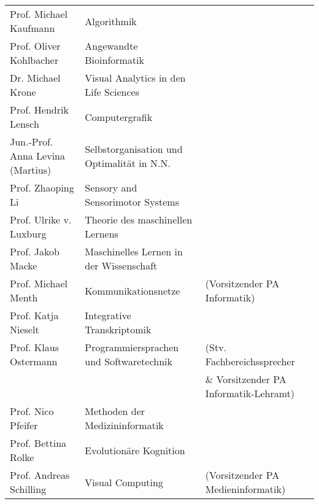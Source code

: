 \begin{tabular}{|lll|}
	Prof. Michael Kaufmann           & Algorithmik                                           &                                          \\
	Prof. Oliver Kohlbacher          & Angewandte Bioinformatik                              &                                          \\
	Dr. Michael Krone                & Visual Analytics in den Life Sciences                 &                                          \\
	Prof. Hendrik Lensch             & Computergrafik                                        &                                          \\
	Jun.-Prof. Anna Levina (Martius) & Selbstorganisation und Optimalität in N.N.            &                                          \\
	Prof. Zhaoping Li                & Sensory and Sensorimotor Systems                      &                                          \\
	Prof. Ulrike v. Luxburg          & Theorie des maschinellen Lernens                      &                                          \\
	Prof. Jakob Macke                & Maschinelles Lernen in der Wissenschaft               &                                          \\
	Prof. Michael Menth              & Kommunikationsnetze                                   & (Vorsitzender PA Informatik)             \\
	Prof. Katja Nieselt              & Integrative Transkriptomik                            &                                          \\
	Prof. Klaus Ostermann            & Programmiersprachen und Softwaretechnik               & (Stv. Fachbereichssprecher               \\
	                                 &                                                       & \& Vorsitzender PA Informatik-Lehramt)   \\
	Prof. Nico Pfeifer               & Methoden der Medizininformatik                        &                                          \\
	Prof. Bettina Rolke              & Evolutionäre Kognition                                &                                          \\
	Prof. Andreas Schilling          & Visual Computing                                      & (Vorsitzender PA Medieninformatik)       \\

\end{tabular}
